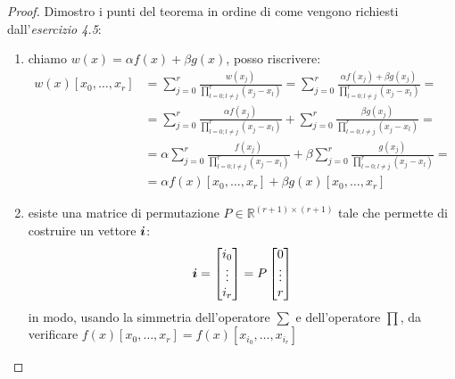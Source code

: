 \begin{proof} Dimostro i punti del teorema in ordine di come vengono richiesti
dall'\emph{esercizio 4.5}:
\begin{enumerate}
  \item chiamo $w(x) = \alpha f(x) + \beta g(x)$, posso riscrivere:
  \begin{displaymath}
  \begin{split}
  	w(x)[x_{0}, \ldots, x_{r}] &= \sum_{j = 0}^{r}{
  		\frac{w(x_{j})}{\prod_{l = 0;l \not = j}^{r}{(x_{j} - x_{l})}}} = 
  		\sum_{j = 0}^{r}{
  		\frac{\alpha f(x_{j}) + \beta g(x_{j})}{\prod_{l = 0;l \not = j}^{r}{(x_{j}
  		- x_{l})}}} =\\
  	&= \sum_{j = 0}^{r}{
  		\frac{\alpha f(x_{j})}{\prod_{l = 0;l \not = j}^{r}{(x_{j} - x_{l})}}} +
  		\sum_{j = 0}^{r}{
  		\frac{\beta g(x_{j})}{\prod_{l = 0;l \not = j}^{r}{(x_{j} - x_{l})}}} = \\
  	&=	\alpha \sum_{j = 0}^{r}{
  		\frac{ f(x_{j})}{\prod_{l = 0;l \not = j}^{r}{(x_{j} - x_{l})}}} +
  		\beta \sum_{j = 0}^{r}{
  		\frac{ g(x_{j})}{\prod_{l = 0;l \not = j}^{r}{(x_{j} - x_{l})}}} = \\
  	&=	\alpha f(x)[x_{0}, \ldots, x_{r}] + \beta g(x)[x_{0}, \ldots, x_{r}]
  \end{split}
  \end{displaymath}
  
  \item esiste una matrice di permutazione $P \in \mathbb{R}^{(r+1) \times
  (r+1)}$ tale che permette di costruire un vettore $\boldsymbol{i}$:
  \begin{displaymath}
  	\boldsymbol{i} = \begin{bmatrix}
  		i_{0} \\ 
  		\vdots \\
  		i_{r}
  	\end{bmatrix} = P\begin{bmatrix}
  		0 \\ 
  		\vdots \\
  		r
  	\end{bmatrix}
  \end{displaymath}
  in modo, usando la simmetria dell'operatore $\sum$ e dell'operatore $\prod$, 
  da verificare $f(x)[x_{0}, \ldots, x_{r}] = f(x)[x_{i_{0}}, \ldots,
  x_{i_{r}}]$
  

\end{enumerate}
\end{proof}
